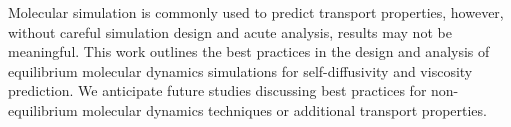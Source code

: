\documentclass[9pt,bestpractices]{livecoms}
\begin{document}
%

Molecular simulation is commonly used to predict transport properties, however, without careful simulation design and acute analysis, results may not be meaningful. This work outlines the best practices in the design and analysis of equilibrium molecular dynamics simulations for self-diffusivity and viscosity prediction. We anticipate future studies discussing best practices for non-equilibrium molecular dynamics techniques or additional transport properties.
\end{document}
